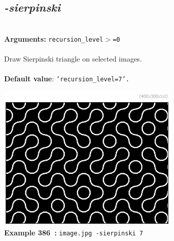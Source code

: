\documentclass[a4paper,11pt,twoside]{book}
\begin{document}
\subsection{\emph{-sierpinski} }\vspace*{-0.5em}
~\\\textbf{Arguments: } 
{\small \texttt{recursion\_level$>$=0}}\\~\\
Draw Sierpinski triangle on selected images.
~\\~\\\textbf{Default value}: {\small \texttt{'recursion\_level=7'.}}
\begin{center}\includegraphics[keepaspectratio=true,height=7cm,width=\textwidth]{img/gmic_def386.jpg}\\
{\footnotesize \textbf{Example 386~:} \texttt{image.jpg -sierpinski 7}}
\end{center}
\end{document}
